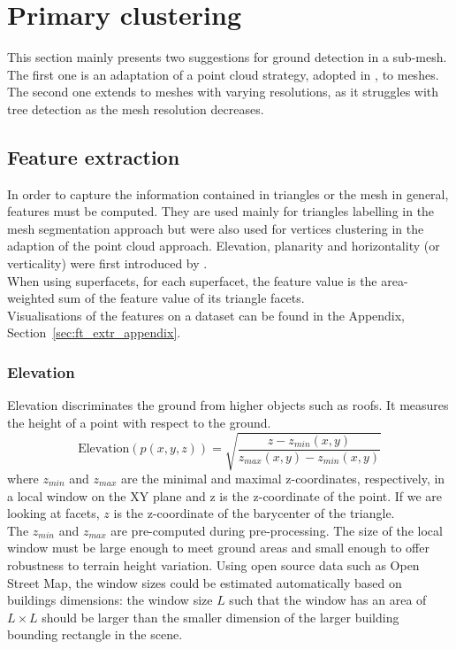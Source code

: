 \documentclass{kththesis}
\begin{document}
\section{Primary clustering}\label{sec:primary_clustering}
This section mainly presents two suggestions for ground detection in a sub-mesh. The first one is an adaptation of a point cloud strategy, adopted in \parencite{HernandezArtefacts, det_seg_class}, to meshes. The second one extends \parencite{verdie} to meshes with varying resolutions, as it struggles with tree detection as the mesh resolution decreases. 
\subsection{Feature extraction}
\label{sec:ft_extract}
In order to capture the information contained in triangles or the mesh in general, features must be computed. They are used mainly for triangles labelling in the mesh segmentation approach but were also used for vertices clustering in the adaption of the point cloud approach. Elevation, planarity and horizontality (or verticality) were first introduced by \textcite{verdie}. \\ 
When using superfacets, for each superfacet, the feature value is  the area-weighted sum of the feature value
of its triangle facets. \\
Visualisations of the features on a dataset can be found in the Appendix, Section~\ref{sec:ft_extr_appendix}. 
\subsubsection{Elevation}
Elevation discriminates the ground from higher objects
such as roofs. It measures the height of a point with respect
to the ground. 
$$\text{Elevation}(p(x,y,z)) = \sqrt{\frac{z - z_{min}(x,y)}{z_{max}(x,y)- z_{min}(x,y)}}$$
where $z_{min}$ and $z_{max}$ are the minimal and maximal z-coordinates, respectively, in a local window on the XY plane and z is the z-coordinate of the point. If we are looking at facets, $z$ is the z-coordinate of the barycenter of the triangle. \\
The $z_{min}$ and $z_{max}$ are pre-computed during pre-processing. The size of the local window must be large enough to meet ground areas and small enough to offer robustness to terrain height variation. Using open source data such as Open Street Map, the window sizes could be estimated automatically based on buildings dimensions: the window size $L$ such that the window has an area of $L\times L$ should be larger than the smaller dimension of the larger building bounding rectangle in the scene. 
\end{document}

